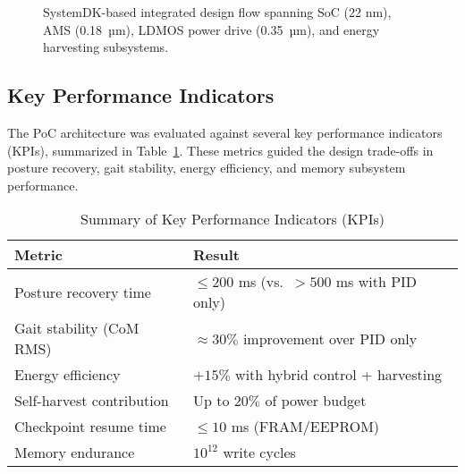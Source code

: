 \begin{figure}[t]
  \centering
  \caption{SystemDK-based integrated design flow spanning SoC (22 nm), AMS (0.18~µm),
    LDMOS power drive (0.35~µm), and energy harvesting subsystems.}
  \label{fig:systemdk_flow}
\end{figure}

\subsection{Key Performance Indicators}
The PoC architecture was evaluated against several key performance indicators (KPIs),
summarized in Table~\ref{tab:kpi_summary}. These metrics guided the design trade-offs
in posture recovery, gait stability, energy efficiency, and memory subsystem performance.

\begin{table}[t]
\caption{Summary of Key Performance Indicators (KPIs)}
\label{tab:kpi_summary}
\centering
\renewcommand{\arraystretch}{1.15}
\footnotesize
\begin{tabular}{@{}p{} p{}@{}}
\toprule
\textbf{Metric} & \textbf{Result} \\
\midrule
Posture recovery time & $\leq 200$ ms (vs.\ $>500$ ms with PID only) \\
Gait stability (CoM RMS) & $\approx 30\%$ improvement over PID only \\
Energy efficiency & $+15\%$ with hybrid control + harvesting \\
Self-harvest contribution & Up to $20\%$ of power budget \\
Checkpoint resume time & $\leq 10$ ms (FRAM/EEPROM) \\
Memory endurance & $10^{12}$ write cycles \\
\bottomrule
\end{tabular}
\end{table}
